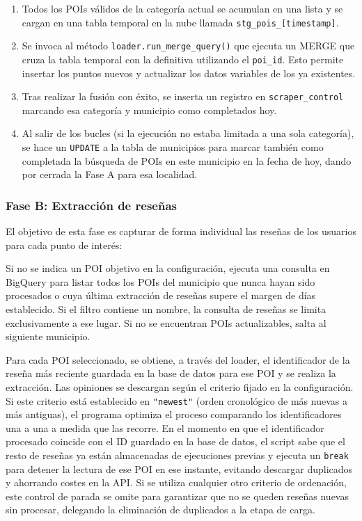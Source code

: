 \begin{enumerate}
    \item Todos los POIs válidos de la categoría actual se acumulan en una lista y se cargan en una tabla temporal en la nube llamada \texttt{stg\_pois\-\_[timestamp]}.
    \item Se invoca al método \texttt{loader.run\_merge\_query()} que ejecuta un MERGE que cruza la tabla temporal con la definitiva utilizando el \texttt{poi\_id}. Esto permite insertar los puntos nuevos y actualizar los datos variables de los ya existentes.
    \item Tras realizar la fusión con éxito, se inserta un registro en \texttt{scraper\-\_control} marcando esa categoría y municipio como completados hoy.
    \item Al salir de los bucles (si la ejecución no estaba limitada a una sola categoría), se hace un \texttt{UPDATE} a la tabla de municipios para marcar también como completada la búsqueda de POIs en este municipio en la fecha de hoy, dando por cerrada la Fase A para esa localidad.
\end{enumerate}

\subsubsection{Fase B: Extracción de reseñas}
El objetivo de esta fase es capturar de forma individual las reseñas de los usuarios para cada punto de interés:

Si no se indica un POI objetivo en la configuración, ejecuta una consulta en BigQuery para listar todos los POIs del municipio que nunca hayan sido procesados o cuya última extracción de reseñas supere el margen de días establecido. Si el filtro contiene un nombre, la consulta de reseñas se limita exclusivamente a ese lugar. Si no se encuentran POIs actualizables, salta al siguiente municipio.

Para cada POI seleccionado, se obtiene, a través del loader, el identificador de la reseña más reciente guardada en la base de datos para ese POI y se realiza la extracción. Las opiniones se descargan según el criterio fijado en la configuración. Si este criterio está establecido en \texttt{"newest"} (orden cronológico de más nuevas a más antiguas), el programa optimiza el proceso comparando los identificadores una a una a medida que las recorre. En el momento en que el identificador procesado coincide con el ID guardado en la base de datos, el script sabe que el resto de reseñas ya están almacenadas de ejecuciones previas y ejecuta un \texttt{break} para detener la lectura de ese POI en ese instante, evitando descargar duplicados y ahorrando costes en la API. Si se utiliza cualquier otro criterio de ordenación, este control de parada se omite para garantizar que no se queden reseñas nuevas sin procesar, delegando la eliminación de duplicados a la etapa de carga.

